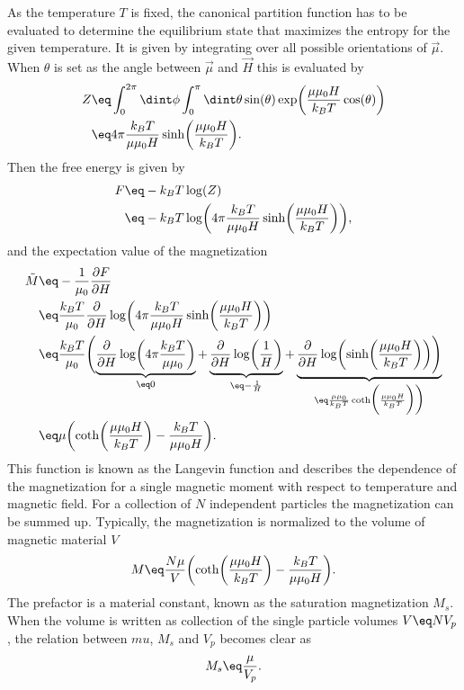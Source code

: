 \documentclass[\main/dresen_thesis.tex]{subfiles}
\begin{document}
As the temperature $T$ is fixed, the canonical partition function has to be evaluated to determine the equilibrium state that maximizes the entropy for the given temperature.
It is given by integrating over all possible orientations of $\vec{\mu}$.
When $\theta$ is set as the angle between $\vec{\mu}$ and $\vec{H}$ this is evaluated by
\begin{align}
  Z \eq& \int_0^{2\pi} \dint \phi \int_0^\pi \dint \theta \sin(\theta) \exp \biggl(\frac{\mu \mu_0 H}{k_B T} \cos(\theta) \biggr)\\
  \eq& 4 \pi \frac{k_B T}{ \mu \mu_0 H} \sinh \biggl( \frac{\mu \mu_0 H}{k_B T} \biggr).
\end{align}
Then the free energy is given by
\begin{align}
  F \eq& -k_B T \log(Z)\\
  \eq& -k_B T \log \biggl( 4 \pi \frac{k_B T}{ \mu \mu_0 H}  \sinh \biggl( \frac{\mu \mu_0 H}{k_B T} \biggr) \biggr),
\end{align}
and the expectation value of the magnetization
\begin{align}
  \tilde{M} \eq& - \frac{1}{\mu_0 } \frac{\partial F}{\partial H}\\
  \eq& \frac{k_B T}{\mu_0 } \frac{\partial}{\partial H} \log \biggl( 4 \pi \frac{k_B T}{ \mu \mu_0 H}  \sinh \biggl( \frac{\mu \mu_0 H}{k_B T} \biggr) \biggr)\\
  \eq& \frac{k_B T}{\mu_0 } \Biggl(
    \underbrace{\frac{\partial}{\partial H} \log \biggl( 4 \pi \frac{k_B T}{ \mu \mu_0} \biggr)}_{\eq 0}
  + \underbrace{\frac{\partial}{\partial H} \log \biggl( \frac{1}{H} \biggr)}_{\eq - \frac{1}{H}}
  + \underbrace{\frac{\partial}{\partial H}\log  \biggl(  \sinh \biggl( \frac{\mu \mu_0 H}{k_B T} \biggr) \biggr) \Biggr)}_{\eq \frac{\mu \mu_0}{k_B T} \coth \biggl( \frac{\mu \mu_0 H}{k_B T} \biggr) \biggr)}\\
  \eq& \mu \biggl(\coth \biggl( \frac{\mu \mu_0 H}{k_B T} \biggr) - \frac{k_B T}{\mu \mu_0 H} \biggr).
\end{align}
This function is known as the Langevin function and describes the dependence of the magnetization for a single magnetic moment with respect to temperature and magnetic field.
For a collection of $N$ independent particles the magnetization can be summed up.
Typically, the magnetization is normalized to the volume of magnetic material $V$
\begin{align}
  M \eq \frac{N \mu}{V} \biggl(\coth \biggl( \frac{\mu \mu_0 H}{k_B T} \biggr) - \frac{k_B T}{\mu \mu_0 H} \biggr).
\end{align}
The prefactor is a material constant, known as the saturation magnetization $M_s$.
When the volume is written as collection of the single particle volumes $V \eq N V_p$, the relation between $mu$, $M_s$ and $V_p$ becomes clear as
\begin{align}
  M_s \eq \frac{\mu}{V_p}.
\end{align}
\end{document}

